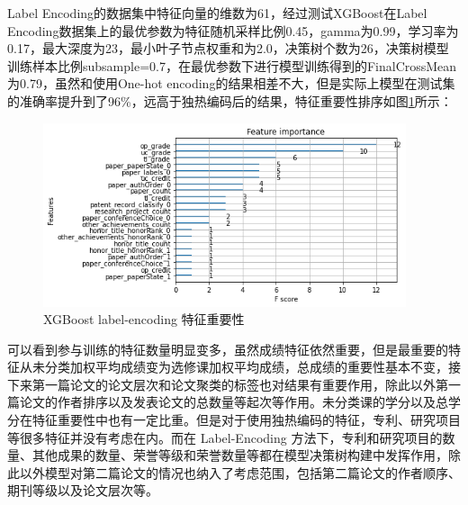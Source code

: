 Label Encoding的数据集中特征向量的维数为61，经过测试XGBoost在Label Encoding数据集上的最优参数为特征随机采样比例0.45，gamma为0.99，学习率为0.17，最大深度为23，最小叶子节点权重和为2.0，决策树个数为26，决策树模型训练样本比例subsample=0.7，在最优参数下进行模型训练得到的FinalCrossMean为0.79，虽然和使用One-hot encoding的结果相差不大，但是实际上模型在测试集的准确率提升到了96\%，远高于独热编码后的结果，特征重要性排序如图\ref{XGBoost-label-encoding-feature-importance}所示：
\begin{figure}[htb]
  \vspace{13pt} %
  \centering
  \includegraphics[width=0.95\textwidth]{images/XGBoost-label-encoding-feature-importance.png}
  \caption{XGBoost label-encoding 特征重要性}\label{XGBoost-label-encoding-feature-importance} %
\end{figure}


可以看到参与训练的特征数量明显变多，虽然成绩特征依然重要，但是最重要的特征从未分类加权平均成绩变为选修课加权平均成绩，总成绩的重要性基本不变，接下来第一篇论文的论文层次和论文聚类的标签也对结果有重要作用，除此以外第一篇论文的作者排序以及发表论文的总数量等起次等作用。未分类课的学分以及总学分在特征重要性中也有一定比重。但是对于使用独热编码的特征，专利、研究项目等很多特征并没有考虑在内。而在 Label-Encoding 方法下，专利和研究项目的数量、其他成果的数量、荣誉等级和荣誉数量等都在模型决策树构建中发挥作用，除此以外模型对第二篇论文的情况也纳入了考虑范围，包括第二篇论文的作者顺序、期刊等级以及论文层次等。

